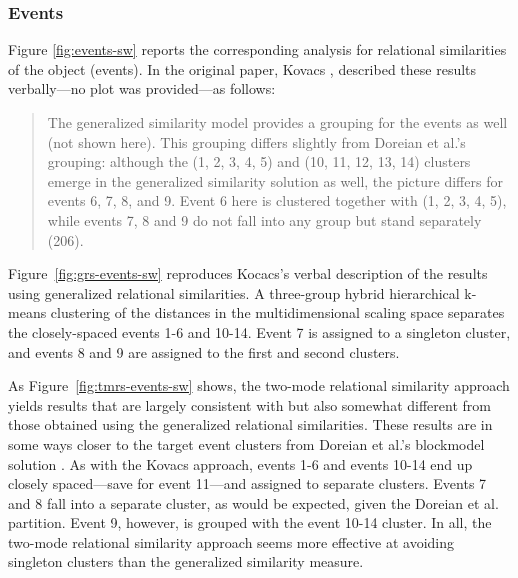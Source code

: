 \documentclass[a4paper,fleqn]{cas-sc}
\begin{document}
\subsubsection{Events}
Figure \ref{fig:events-sw} reports the corresponding analysis for relational similarities of the object (events). In the original paper, Kovacs \citeyearpar[206]{kovacs2010}, described these results verbally---no plot was provided---as follows:

\begin{quote}
The generalized similarity model provides a grouping for the events as well (not shown here). This grouping differs slightly from Doreian et al.'s \citeyearpar{doreian2004} grouping: although the (1, 2, 3, 4, 5) and (10, 11, 12, 13, 14) clusters emerge in the generalized similarity solution as well, the picture differs for events 6, 7, 8, and 9. Event 6 here is clustered together with (1, 2, 3, 4, 5), while events 7, 8 and 9 do not fall into any group but stand separately  (206). 
\end{quote}

Figure~\ref{fig:grs-events-sw} reproduces Kocacs's verbal description of the results using generalized relational similarities. A three-group hybrid hierarchical k-means clustering of the distances in the multidimensional scaling space separates the closely-spaced events 1-6 and 10-14. Event 7 is assigned to a singleton cluster, and events 8 and 9 are assigned to the first and second clusters. 

As Figure~\ref{fig:tmrs-events-sw} shows, the two-mode relational similarity approach yields results that are largely consistent with but also somewhat different from those obtained using the generalized relational similarities. These results are in some ways closer to the target event clusters from Doreian et al.'s blockmodel solution \citeyearpar{doreian2004}. As with the Kovacs approach, events 1-6 and events 10-14 end up closely spaced---save for event 11---and assigned to separate clusters. Events 7 and 8 fall into a separate cluster, as would be expected, given the Doreian et al. partition. Event 9, however, is grouped with the event 10-14 cluster. In all, the two-mode relational similarity approach seems more effective at avoiding singleton clusters than the generalized similarity measure. 
\end{document}
